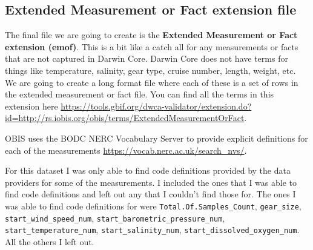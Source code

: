 \documentclass[
]{book}
\begin{document}
\hypertarget{extended-measurement-or-fact-extension-file}{%
\subsection{Extended Measurement or Fact extension file}\label{extended-measurement-or-fact-extension-file}}

The final file we are going to create is the \textbf{Extended Measurement or Fact extension (emof)}. This is a bit like a catch all for any measurements or facts that are not captured in Darwin Core. Darwin Core does not have terms for things like temperature, salinity, gear type, cruise number, length, weight, etc. We are going to create a long format file where each of these is a set of rows in the extended measurement or fact file. You can find all the terms in this extension here \url{https://tools.gbif.org/dwca-validator/extension.do?id=http://rs.iobis.org/obis/terms/ExtendedMeasurementOrFact}.

OBIS uses the BODC NERC Vocabulary Server to provide explicit definitions for each of the measurements \url{https://vocab.nerc.ac.uk/search_nvs/}.

For this dataset I was only able to find code definitions provided by the data providers for some of the measurements. I included the ones that I was able to find code definitions and left out any that I couldn't find those for. The ones I was able to find code definitions for were \texttt{Total.Of.Samples\_Count}, \texttt{gear\_size}, \texttt{start\_wind\_speed\_num}, \texttt{start\_barometric\_pressure\_num}, \texttt{start\_temperature\_num}, \texttt{start\_salinity\_num}, \texttt{start\_dissolved\_oxygen\_num}. All the others I left out.
\end{document}
